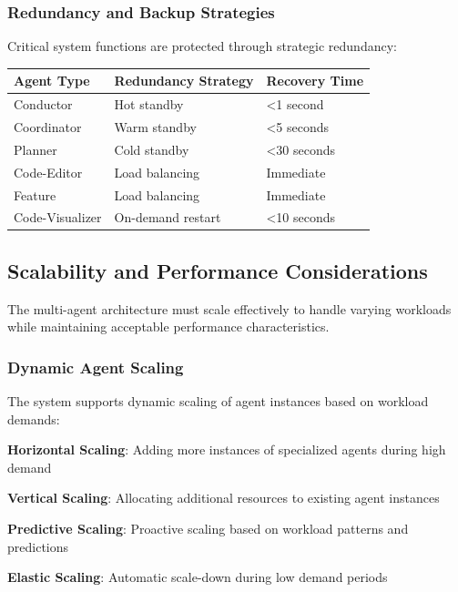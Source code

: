 \subsubsection*{Redundancy and Backup Strategies}

Critical system functions are protected through strategic redundancy:

\begin{center}
\begin{tabular}{@{}lll@{}}
\toprule
\textbf{Agent Type} & \textbf{Redundancy Strategy} & \textbf{Recovery Time} \\
\midrule
Conductor & Hot standby & <1 second \\
Coordinator & Warm standby & <5 seconds \\
Planner & Cold standby & <30 seconds \\
Code-Editor & Load balancing & Immediate \\
Feature & Load balancing & Immediate \\
Code-Visualizer & On-demand restart & <10 seconds \\
\bottomrule
\end{tabular}
\end{center}

\subsection*{Scalability and Performance Considerations}

The multi-agent architecture must scale effectively to handle varying workloads while maintaining acceptable performance characteristics.

\subsubsection*{Dynamic Agent Scaling}

The system supports dynamic scaling of agent instances based on workload demands:

\begin{compactlist}
    \item \textbf{Horizontal Scaling}: Adding more instances of specialized agents during high demand
    \item \textbf{Vertical Scaling}: Allocating additional resources to existing agent instances
    \item \textbf{Predictive Scaling}: Proactive scaling based on workload patterns and predictions
    \item \textbf{Elastic Scaling}: Automatic scale-down during low demand periods
\end{compactlist}

